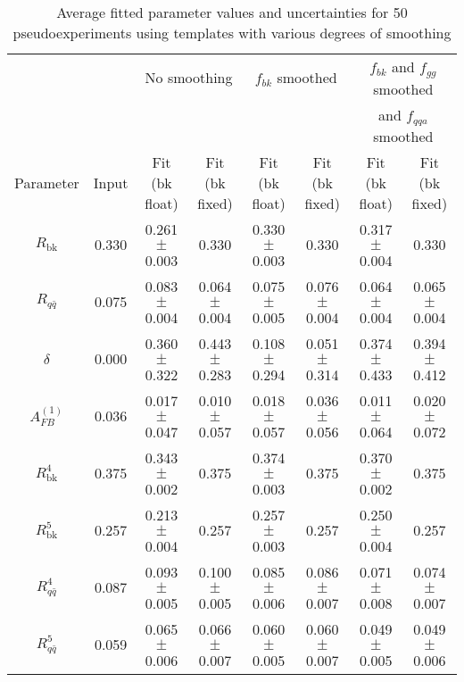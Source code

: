 \documentclass{cmspaperpdf}
\begin{document}
\begin{table}[hbt]
\begin{center}
\caption{\small \label{tab:smoothing_experiments} Average fitted parameter values and uncertainties for 50 pseudoexperiments using templates with various degrees of smoothing}
\small
\vspace{3pt}
\begin{tabular}{|c|c|cc|cc|cc|} \hline
                  &       & \multicolumn{2}{|c}{No smoothing}   & \multicolumn{2}{|c}{$f_{bk}$ smoothed}   & \multicolumn{2}{|c|}{$f_{bk}$ and $f_{gg}$ smoothed}  \\
                  &       &                  &                  &                  &                                                  & \multicolumn{2}{|c|}{and $f_{qqa}$ smoothed}        \\                                                        
Parameter         & Input & Fit (bk float)   & Fit (bk fixed)   & Fit (bk float)   & Fit (bk fixed)        & Fit (bk float)   & Fit (bk fixed)              \\ 
\hline
$R_\mathrm{bk}$   & 0.330 & 0.261$\pm$0.003  & 0.330            & 0.330$\pm$0.003  & 0.330                 & 0.317$\pm$0.004  & 0.330            \\ 
$R_{q\bar q}$     & 0.075 & 0.083$\pm$0.004  & 0.064$\pm$0.004  & 0.075$\pm$0.005  & 0.076$\pm$0.004       & 0.064$\pm$0.004  & 0.065$\pm$0.004         \\ 
$\delta$          & 0.000 & 0.360$\pm$0.322  & 0.443$\pm$0.283  & 0.108$\pm$0.294  & 0.051$\pm$0.314       & 0.374$\pm$0.433  & 0.394$\pm$0.412            \\ 
$A^{(1)}_{FB}$    & 0.036 & 0.017$\pm$0.047  & 0.010$\pm$0.057  & 0.018$\pm$0.057  & 0.036$\pm$0.056       & 0.011$\pm$0.064  & 0.020$\pm$0.072        \\ 
\hline
$R^4_\mathrm{bk}$ & 0.375 & 0.343$\pm$0.002  & 0.375            & 0.374$\pm$0.003  & 0.375                 & 0.370$\pm$0.002  & 0.375                       \\ 
$R^5_\mathrm{bk}$ & 0.257 & 0.213$\pm$0.004  & 0.257            & 0.257$\pm$0.003  & 0.257                 & 0.250$\pm$0.004  & 0.257                        \\ 
$R^4_{q\bar q}$   & 0.087 & 0.093$\pm$0.005  & 0.100$\pm$0.005  & 0.085$\pm$0.006  & 0.086$\pm$0.007       & 0.071$\pm$0.008  & 0.074$\pm$0.007        \\ 
$R^5_{q\bar q}$   & 0.059 & 0.065$\pm$0.006  & 0.066$\pm$0.007  & 0.060$\pm$0.005  & 0.060$\pm$0.007       & 0.049$\pm$0.005  & 0.049$\pm$0.006       \\ 

\end{tabular}
\end{center}
\end{table}
\end{document}
